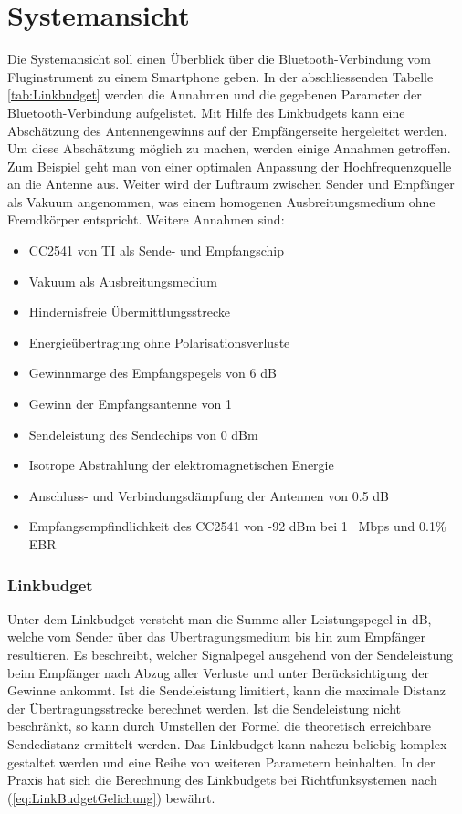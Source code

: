 \section{Systemansicht}
Die Systemansicht soll einen Überblick über die Bluetooth-Verbindung vom Fluginstrument zu einem Smartphone geben.
In der abschliessenden Tabelle \ref{tab:Linkbudget} werden die Annahmen und die gegebenen Parameter der Bluetooth-Verbindung aufgelistet. Mit Hilfe des Linkbudgets kann eine Abschätzung des Antennengewinns auf der Empfängerseite hergeleitet werden. Um diese Abschätzung möglich zu machen, werden einige Annahmen getroffen. Zum Beispiel geht man von einer optimalen Anpassung der Hochfrequenzquelle an die Antenne aus. Weiter wird der Luftraum zwischen Sender und Empfänger als Vakuum angenommen, was einem homogenen Ausbreitungsmedium ohne Fremdkörper entspricht.
Weitere Annahmen sind:
\begin{itemize}
\item CC2541 von TI als Sende- und Empfangschip
\item Vakuum als Ausbreitungsmedium
\item Hindernisfreie Übermittlungsstrecke
\item Energieübertragung ohne Polarisationsverluste
\item Gewinnmarge des Empfangspegels von 6 dB
\item Gewinn der Empfangsantenne von 1
\item Sendeleistung des Sendechips von 0 dBm
\item Isotrope Abstrahlung der elektromagnetischen Energie
\item Anschluss- und Verbindungsdämpfung der Antennen von 0.5 dB
\item Empfangsempfindlichkeit des CC2541 von -92 dBm bei 1 \ Mbps und 0.1\% EBR 
\end{itemize}


\subsubsection{Linkbudget}
Unter dem Linkbudget versteht man die Summe aller Leistungspegel in dB, welche vom Sender über das Übertragungsmedium bis hin zum Empfänger resultieren. Es beschreibt, welcher Signalpegel ausgehend von der Sendeleistung beim Empfänger nach Abzug aller Verluste und unter Berücksichtigung der Gewinne ankommt. Ist die Sendeleistung limitiert, kann die maximale Distanz der Übertragungsstrecke berechnet werden. Ist die Sendeleistung nicht beschränkt, so kann durch Umstellen der Formel die theoretisch erreichbare Sendedistanz ermittelt werden. Das Linkbudget kann nahezu beliebig komplex gestaltet werden und eine Reihe von weiteren Parametern beinhalten. In der Praxis hat sich die Berechnung des Linkbudgets bei Richtfunksystemen nach  (\ref{eq:LinkBudgetGelichung}) bewährt.

